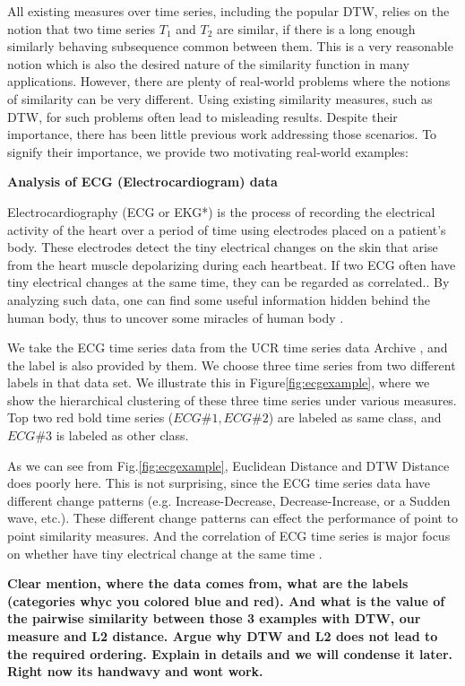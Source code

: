 All existing measures over time series, including the popular DTW, relies on the notion that two time series $T_1$ and $T_2$ are similar, if there is a long enough similarly behaving subsequence common between them. This is a very reasonable notion which is also the desired nature of the similarity function in many applications.  However, there are plenty of real-world problems where the notions of similarity can be very different. Using existing similarity measures, such as DTW, for such problems often lead to misleading results. Despite their importance, there has been little previous work addressing those scenarios. To signify their importance, we provide two motivating real-world examples:

\textbf{Analysis of ECG (Electrocardiogram) data}

Electrocardiography \cite{holter1961new} (ECG or EKG*)
is the process of recording the electrical activity of the heart over a period of time using electrodes placed on a patient's body.
These electrodes detect the tiny electrical changes on the skin that arise from the heart muscle depolarizing during each heartbeat.
If two ECG often have tiny electrical changes at the same time, they can be regarded as correlated.\cite{marriott1988practical}.
By analyzing such data, one can find some useful information hidden behind the human body, thus to uncover some miracles of human body \cite{tilley1979essentials}.

We take the ECG time series data from the UCR time series data Archive \cite{UCRArchive}, and the label is also provided by them.
We choose three time series from two different labels in that data set.
We illustrate this in Figure\ref{fig:ecgexample}, where we show the hierarchical clustering of these three time series under various measures. 
Top two red bold time series ($ECG\#1,ECG\#2$) are labeled as same class, and $ECG \#3$ is labeled as other class.

As we can see from Fig.\ref{fig:ecgexample}, Euclidean Distance and DTW Distance does poorly here. 
This is not surprising, since the ECG time series data have different change patterns (e.g. Increase-Decrease, Decrease-Increase, or a Sudden wave, etc.). These different change patterns can effect the performance of point to point similarity measures.
And the correlation of ECG time series is major focus on whether have tiny electrical change at the same time \cite{tilley1979essentials}.

{\bf \color{red} Clear mention, where the data comes from, what are the labels (categories whyc you colored blue and red). And what is the value of the pairwise similarity between those 3 examples with DTW, our measure and L2 distance. Argue why DTW and L2 does not lead to the required ordering. Explain in details and we will condense it later. Right now its handwavy and wont work.}


